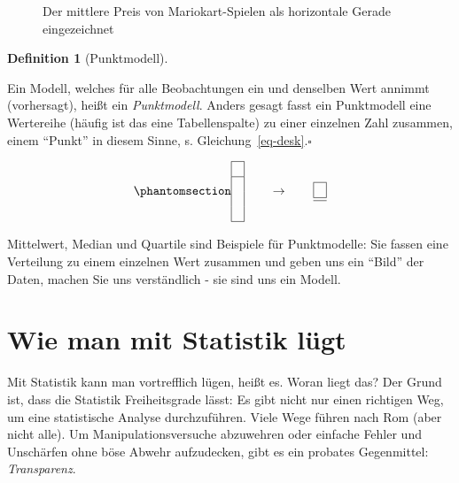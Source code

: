 \documentclass[
  a4paper,
]{scrbook}
\theoremstyle{definition}
\theoremstyle{definition}
\newtheorem{definition}{Definition}[chapter]
\theoremstyle{definition}
\theoremstyle{remark}
\begin{document}
\begin{figure}
\begin{minipage}{0.50\linewidth}
{}


\end{minipage}%

\caption{\label{fig-mw3}Der mittlere Preis von Mariokart-Spielen als
horizontale Gerade eingezeichnet}

\end{figure}%

\begin{definition}[Punktmodell]\protect\hypertarget{def-punktmodell}{}\label{def-punktmodell}

Ein Modell, welches für alle Beobachtungen ein und denselben Wert
annimmt (vorhersagt), heißt ein \emph{Punktmodell}. Anders gesagt fasst
ein Punktmodell eine Wertereihe (häufig ist das eine Tabellenspalte) zu
einer einzelnen Zahl zusammen, einem ``Punkt'' in diesem Sinne, s.
Gleichung~\ref{eq-desk}.\(\square\)

\end{definition}

\begin{equation}\phantomsection\label{eq-desk}{\begin{array}{|c|} \hline \\ \hline \\\\\\ \hline \end{array} \qquad \rightarrow \qquad \begin{array}{|c|} \hline \\ \hline  \hline \end{array}}\end{equation}

Mittelwert, Median und Quartile sind Beispiele für Punktmodelle: Sie
fassen eine Verteilung zu einem einzelnen Wert zusammen und geben uns
ein ``Bild'' der Daten, machen Sie uns verständlich - sie sind uns ein
Modell.

\section{Wie man mit Statistik
lügt}\label{wie-man-mit-statistik-luxfcgt-2}

Mit Statistik kann man vortrefflich lügen, heißt es. Woran liegt das?
Der Grund ist, dass die Statistik Freiheitsgrade lässt: Es gibt nicht
nur einen richtigen Weg, um eine statistische Analyse durchzuführen.
Viele Wege führen nach Rom (aber nicht alle). Um Manipulationsversuche
abzuwehren oder einfache Fehler und Unschärfen ohne böse Abwehr
aufzudecken, gibt es ein probates Gegenmittel: \emph{Transparenz}.
\end{document}
